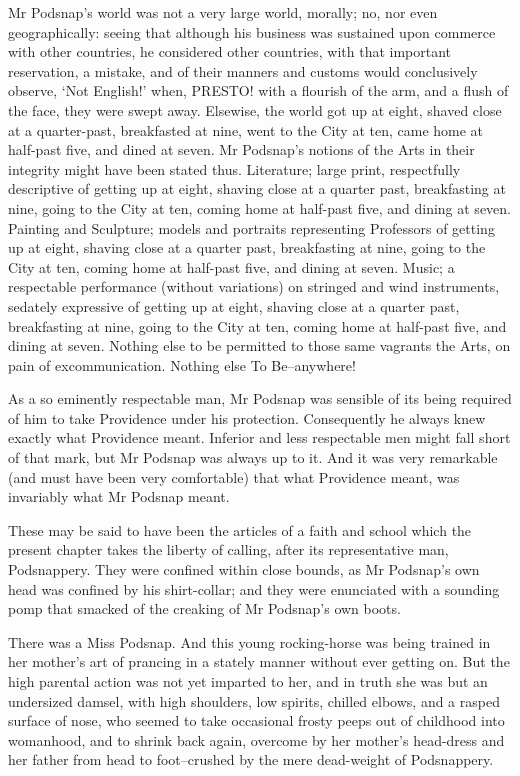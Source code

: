 Mr Podsnap’s world was not a very large world, morally; no, nor even
geographically: seeing that although his business was sustained upon
commerce with other countries, he considered other countries, with that
important reservation, a mistake, and of their manners and customs would
conclusively observe, ‘Not English!’ when, PRESTO! with a flourish of
the arm, and a flush of the face, they were swept away. Elsewise, the
world got up at eight, shaved close at a quarter-past, breakfasted at
nine, went to the City at ten, came home at half-past five, and dined
at seven. Mr Podsnap’s notions of the Arts in their integrity might have
been stated thus. Literature; large print, respectfully descriptive of
getting up at eight, shaving close at a quarter past, breakfasting
at nine, going to the City at ten, coming home at half-past five,
and dining at seven. Painting and Sculpture; models and portraits
representing Professors of getting up at eight, shaving close at a
quarter past, breakfasting at nine, going to the City at ten, coming
home at half-past five, and dining at seven. Music; a respectable
performance (without variations) on stringed and wind instruments,
sedately expressive of getting up at eight, shaving close at a quarter
past, breakfasting at nine, going to the City at ten, coming home at
half-past five, and dining at seven. Nothing else to be permitted to
those same vagrants the Arts, on pain of excommunication. Nothing else
To Be--anywhere!

As a so eminently respectable man, Mr Podsnap was sensible of its being
required of him to take Providence under his protection. Consequently he
always knew exactly what Providence meant. Inferior and less respectable
men might fall short of that mark, but Mr Podsnap was always up to it.
And it was very remarkable (and must have been very comfortable) that
what Providence meant, was invariably what Mr Podsnap meant.

These may be said to have been the articles of a faith and school
which the present chapter takes the liberty of calling, after its
representative man, Podsnappery. They were confined within close bounds,
as Mr Podsnap’s own head was confined by his shirt-collar; and they
were enunciated with a sounding pomp that smacked of the creaking of Mr
Podsnap’s own boots.

There was a Miss Podsnap. And this young rocking-horse was being trained
in her mother’s art of prancing in a stately manner without ever getting
on. But the high parental action was not yet imparted to her, and
in truth she was but an undersized damsel, with high shoulders, low
spirits, chilled elbows, and a rasped surface of nose, who seemed to
take occasional frosty peeps out of childhood into womanhood, and to
shrink back again, overcome by her mother’s head-dress and her father
from head to foot--crushed by the mere dead-weight of Podsnappery.

